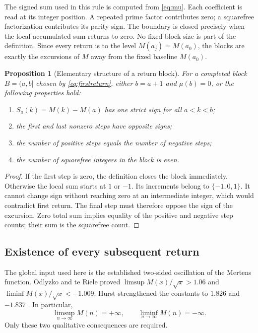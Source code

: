 \documentclass[11pt]{article}
\newtheorem{proposition}[theorem]{Proposition}
\theoremstyle{definition}
\theoremstyle{remark}
\begin{document}
The signed sum used in this rule is computed from \eqref{eq:mu}. Each coefficient is read at its integer position. A repeated prime factor contributes zero; a squarefree factorization contributes its parity sign. The boundary is closed precisely when the local accumulated sum returns to zero. No fixed block size is part of the definition. Since every return is to the level $M(a_j)=M(a_0)$, the blocks are exactly the excursions of $M$ away from the fixed baseline $M(a_0)$.

\begin{proposition}[Elementary structure of a return block]
For a completed block $B=(a,b]$ chosen by \eqref{eq:firstreturn}, either $b=a+1$ and $\mu(b)=0$, or the following properties hold:
\begin{enumerate}[label=(\arabic*)]
\item $S_a(k)=M(k)-M(a)$ has one strict sign for all $a<k<b$;
\item the first and last nonzero steps have opposite signs;
\item the number of positive steps equals the number of negative steps;
\item the number of squarefree integers in the block is even.
\end{enumerate}
\end{proposition}

\begin{proof}
If the first step is zero, the definition closes the block immediately. Otherwise the local sum starts at $1$ or $-1$. Its increments belong to $\{-1,0,1\}$. It cannot change sign without reaching zero at an intermediate integer, which would contradict first return. The final step must therefore oppose the sign of the excursion. Zero total sum implies equality of the positive and negative step counts; their sum is the squarefree count.
\end{proof}

\subsection{Existence of every subsequent return}

The global input used here is the established two-sided oscillation of the Mertens function. Odlyzko and te Riele proved $\limsup M(x)/\sqrt x>1.06$ and $\liminf M(x)/\sqrt x<-1.009$; Hurst strengthened the constants to $1.826$ and $-1.837$ \cite{odlyzko-teriele,hurst}. In particular,
\begin{equation}\label{eq:osc}
\limsup_{n\to\infty}M(n)=+\infty,\qquad \liminf_{n\to\infty}M(n)=-\infty.
\end{equation}
Only these two qualitative consequences are required.
\end{document}
